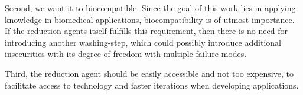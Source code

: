 Second, we want it to biocompatible. Since the goal of this work lies in applying knowledge in biomedical applications, biocompatibility is of utmost importance. If the reduction agents itself fulfills this requirement, then there is no need for introducing another washing-step, which could possibly introduce additional insecurities with its degree of freedom with multiple failure modes.


Third, the reduction agent should be easily accessible and not too expensive, to facilitate access to technology and faster iterations when developing applications.


